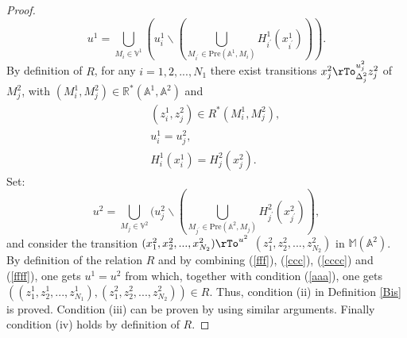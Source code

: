 \documentclass{amsart}
\theoremstyle{definition}
\theoremstyle{remark}
\numberwithin{equation}{section}
\newcommand{\Pre}{\mathrm{Pre}}
\begin{document}
\begin{proof}
\begin{equation}
u^{1}=\bigcup_{M_{i}\in \mathbb{V}^{1}} (u^{1}_{i} \backslash (\bigcup_{M_{i^{\prime}}\in \Pre(\mathbb{A}^{1},M_{i})}H_{i^{\prime}}^{1}(x_{i^{\prime}}^{1}))).
\label{fff}
\end{equation}
By definition of $R$, for any $i=1,2,...,N_{1}$ there exist transitions $x_{j}^{2}\rTo_{\Delta_{j}^{2}}^{u_{j}^{2}} z_{j}^{2}$ of $M_{j}^{2}$, with $(M_{i}^{1},M_{j}^{2})\in\mathbb{R}^{\ast}(\mathbb{A}^{1},\mathbb{A}^{2})$ and
\begin{eqnarray}
&& (z_{i}^{1},z_{j}^{2})\in R^{\ast}(M_{i}^{1},M_{j}^{2}),\label{aaa}\\
&& u_{i}^{1}=u_{j}^{2},\label{ccc}\\
&& H_{i}^{1}(x_{i}^{1})=H_{j}^{2}(x_{j}^{2}).\label{cccc}
\end{eqnarray}
Set:
\begin{equation}
u^{2}=\bigcup_{M_{j}\in \mathbb{V}^{2}} (u^{2}_{j} \backslash (\bigcup_{M_{j^{\prime}}\in \Pre(\mathbb{A}^{2},M_{j})}H_{j^{\prime}}^{2}(x_{j^{\prime}}^{2})),
\label{ffff}
\end{equation}
and consider the transition $
(x_{1}^{2},x_{2}^{2},...,x_{N_{2}}^{2})\rTo^{u^{2}}$ $(z_{1}^{2},z_{2}^{2},...,z_{N_{2}}^{2})$ in $\mathbb{M}(\mathbb{A}^{2})$. 
By definition of the relation $R$ and by combining (\ref{fff}), (\ref{ccc}), (\ref{cccc}) and (\ref{ffff}), one gets $u^{1}=u^{2}$ from which, together with condition (\ref{aaa}), one gets $
((z_{1}^{1},z_{2}^{1},...,z_{N_{1}}^{1}),(z^{2}_{1},z^{2}_{2},...,z^{2}_{N_{2}}))\in R
$. 
Thus, condition (ii) in Definition \ref{Bis} is proved. Condition (iii) can be proven by using similar arguments. Finally condition (iv) holds by definition of $R$. 
\end{proof}
\end{document}
